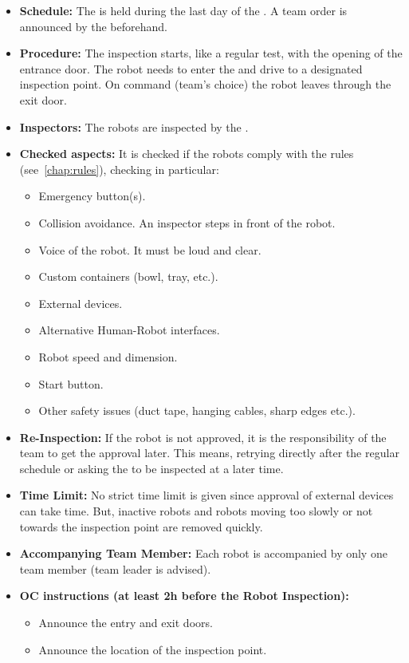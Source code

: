 \begin{itemize}
	\item \textbf{Schedule:} The \RobotInspection{} is held during the last day of the \SetupDays{}. A team order is announced by the \OC{} beforehand.
	\item \textbf{Procedure:} The inspection starts, like a regular test, with the opening of the entrance door. The robot needs to enter the \Arena{} and drive to a designated inspection point. On command (team's choice) the robot leaves through the exit door.
	\item \textbf{Inspectors:} The robots are inspected by the \TC{}.
	\item \textbf{Checked aspects:} It is checked if the robots comply with the rules (see~\ref{chap:rules}), checking in particular:
	\begin{itemize}
		\item Emergency button(s).
		\item Collision avoidance. An inspector steps in front of the robot.
		\item Voice of the robot. It must be loud and clear.
		\item Custom containers (bowl, tray, etc.).
		\item External devices.
		\item Alternative Human-Robot interfaces.
		\item Robot speed and dimension.
		\item Start button.
		\item Other safety issues (duct tape, hanging cables, sharp edges etc.).
	\end{itemize}
	\item \textbf{Re-Inspection:} If the robot is not approved, it is the responsibility of the team to get the approval later. This means, retrying directly after the regular \RobotInspection{} schedule or asking the  to be inspected at a later time.
	\item \textbf{Time Limit:} No strict time limit is given since approval of external devices can take time. But, inactive robots and robots moving too slowly or not towards the inspection point are removed quickly.
	\item \textbf{Accompanying Team Member:} Each robot is accompanied by only one team member (team leader is advised).
	\item \textbf{OC instructions (at least 2h before the Robot Inspection):}
	\begin{itemize}
		\item Announce the entry and exit doors.
		\item Announce the location of the inspection point.
	\end{itemize}
\end{itemize}


